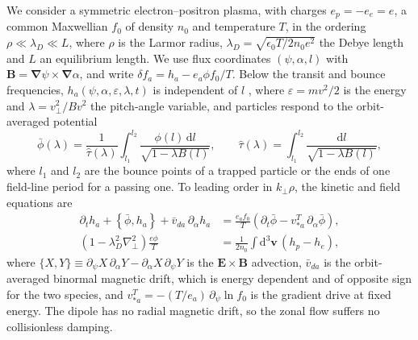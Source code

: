 \documentclass{jpp}
\newcommand{\rmd}{\text{d}}
\newcommand{\pt}{\partial_t}
\renewcommand{\vec}[1]{\boldsymbol{#1}}
\newcommand{\vec}[1]{\boldsymbol{#1}}
\newcommand{\grad}{{\vec{\nabla}}}
\renewcommand{\vv}{{\vec{v}}}
\newcommand{\vv}{{\vec{v}}}
\newcommand{\kperp}{k_\perp}
\newcommand{\pbra}[2]{\left\lbrace #1, #2 \right\rbrace}
\newcommand{\pbrainline}[2]{\lbrace #1, #2 \rbrace}
\newcommand{\vE}{\vec{E}}
\newcommand{\vB}{\vec{B}}
\newcommand{\exb}{\(\vE\times\vB\)}
\newcommand{\lambdaD}{\lambda_D}
\newcommand{\phibar}{\bar\phi}
\newcommand{\vda}{\bar v_{da}}
\begin{document}
We consider a symmetric electron--positron plasma, with charges \(e_p = -e_e = e\), a common Maxwellian \(f_0\) of density \(n_0\) and temperature \(T\), in the ordering \(\rho \ll \lambdaD \ll L\), where \(\rho\) is the Larmor radius, \(\lambdaD = \sqrt{\epsilon_0 T/2n_0e^2}\) the Debye length and \(L\) an equilibrium length. We use flux coordinates \((\psi, \alpha, l)\) with \(\vB = \grad\psi\times\grad\alpha\), and write \(\delta f_a = h_a - e_a\phi f_0/T\). Below the transit and bounce frequencies, \(h_a(\psi,\alpha,\varepsilon,\lambda,t)\) is independent of \(l\) \citep{Helander2014, MPH2018}, where \(\varepsilon = mv^2/2\) is the energy and \(\lambda = v_\perp^2/Bv^2\) the pitch-angle variable, and particles respond to the orbit-averaged potential
\begin{equation}
\phibar(\lambda) = \frac{1}{\hat\tau(\lambda)}\int_{l_1}^{l_2}\frac{\phi(l)\,\rmd l}{\sqrt{1-\lambda B(l)}},
\qquad
\hat\tau(\lambda) = \int_{l_1}^{l_2}\frac{\rmd l}{\sqrt{1-\lambda B(l)}},
\label{eq:orbit}
\end{equation}
where \(l_1\) and \(l_2\) are the bounce points of a trapped particle or the ends of one field-line period for a passing one. To leading order in \(\kperp\rho\), the kinetic and field equations are \citep{Abel2013, MPH2018, KennedyPlunkManuscript}
\begin{align}
\pt h_a + \pbra{\phibar}{h_a} + \vda\,\partial_\alpha h_a
&= \frac{e_af_0}{T}\left(\pt\phibar - v_{*a}^{T}\,\partial_\alpha\phibar\right),\label{eq:kinetic}\\
\left(1-\lambdaD^2\nabla_\perp^2\right)\frac{e\phi}{T}
&= \frac{1}{2n_0}\int\rmd^3\vv\,(h_p-h_e),\label{eq:poisson}
\end{align}
where \(\pbrainline{X}{Y} \equiv \partial_\psi X\,\partial_\alpha Y - \partial_\alpha X\,\partial_\psi Y\) is the \exb{} advection, \(\vda\) is the orbit-averaged binormal magnetic drift, which is energy dependent and of opposite sign for the two species, and \(v_{*a}^{T} = -(T/e_a)\,\partial_\psi\ln f_0\) is the gradient drive at fixed energy. The dipole has no radial magnetic drift, so the zonal flow suffers no collisionless damping.
\end{document}
